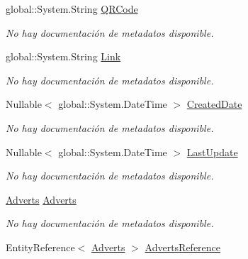 \begin{DoxyCompactItemize}
global\-::\-System.\-String \hyperlink{class_game_memory_1_1_catalog_details_a0602f3d016450f9cb6f0d3ff955bac2b}{Q\-R\-Code}
\begin{DoxyCompactList}\small\item\em No hay documentación de metadatos disponible. \end{DoxyCompactList}\item 
global\-::\-System.\-String \hyperlink{class_game_memory_1_1_catalog_details_ad9b810e2b2a259a71e5ffa8b83bbe47c}{Link}
\begin{DoxyCompactList}\small\item\em No hay documentación de metadatos disponible. \end{DoxyCompactList}\item 
Nullable$<$ global\-::\-System.\-Date\-Time $>$ \hyperlink{class_game_memory_1_1_catalog_details_aba2001ef444874143cc776f9c81c1b7b}{Created\-Date}
\begin{DoxyCompactList}\small\item\em No hay documentación de metadatos disponible. \end{DoxyCompactList}\item 
Nullable$<$ global\-::\-System.\-Date\-Time $>$ \hyperlink{class_game_memory_1_1_catalog_details_a4df71c93f6a92d08c3073b0e5d5a53e4}{Last\-Update}
\begin{DoxyCompactList}\small\item\em No hay documentación de metadatos disponible. \end{DoxyCompactList}\item 
\hyperlink{class_game_memory_1_1_adverts}{Adverts} \hyperlink{class_game_memory_1_1_catalog_details_a306dacf87ecd5eb2d745931a4a1e61a0}{Adverts}
\begin{DoxyCompactList}\small\item\em No hay documentación de metadatos disponible. \end{DoxyCompactList}\item 
Entity\-Reference$<$ \hyperlink{class_game_memory_1_1_adverts}{Adverts} $>$ \hyperlink{class_game_memory_1_1_catalog_details_a5ec9ce97ac5bb4461b10da5ace45e81b}{Adverts\-Reference}

\end{DoxyCompactItemize}
